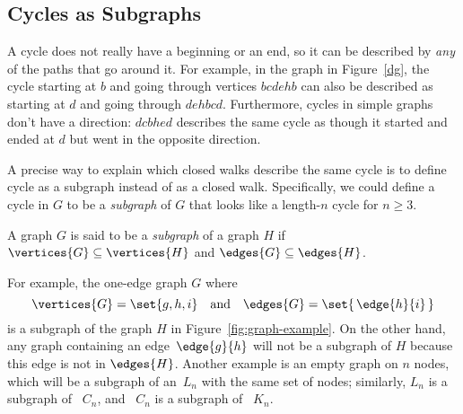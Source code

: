 \iffalse
The vertex sequence $bcdecb$ describes a closed walk in the graph
in Figure~\ref{dg}.  This sequence suggests indicates that the walk
begins and ends at vertex $b$, but

All the paths that describe the same closed walk have the same length
which is defined to be the \term{length of the walk}.  (Note that this
implies that going around the same walk twice is considered to be
different than going around it once.)

More precisely, a cycle is a
closed walk that can be described by a walk of length at least three whose
vertices are all different except for the beginning and end vertices.
So in contrast to \emph{paths}, the length of a \emph{cycle} is the
\emph{same} as the number of distinct vertices that appear in it.

\footnote{Technically speaking, we haven't ever defined what a cycle
\emph{is}, only how to describe it with paths.  But we won't need an
abstract definition of cycle, since all that matters about a cycle is which
paths describe it.}
\fi

\subsection{Cycles as Subgraphs}

A cycle does not really have a beginning or an end, so it can be
described by \emph{any} of the paths that go around it.  For example,
in the graph in Figure~\ref{dg}, the cycle starting at $b$ and going
through vertices $bcdehb$ can also be described as starting at $d$ and
going through $dehbcd$.  Furthermore, cycles in simple graphs don't
have a direction: $dcbhed$ describes the same cycle as though it
started and ended at $d$ but went in the opposite direction.

A precise way to explain which closed walks describe the same cycle is
to define cycle as a subgraph instead of as a closed walk.  Specifically, we
could define a cycle in $G$ to be a \emph{subgraph} of $G$ that looks
like a length-$n$ cycle for $n \ge 3$.

\begin{definition}\label{def:subgraph}
  A graph $G$ is said to be a \emph{subgraph} of a graph $H$ if
  $\vertices{G} \subseteq \vertices{H}$ and $\edges{G} \subseteq
  \edges{H}$.
\end{definition}

For example, the one-edge graph $G$ where
\begin{equation*}
   \vertices{G} = \set{ g, h, i } \quad \text{and}\quad  \edges{G} =
   \set{\, \edge{h}{i} \, }
\end{equation*}
is a subgraph of the graph $H$ in Figure~\ref{fig:graph-example}.  On the
other hand, any graph containing an edge~$\edge{g}{h}$ will not be a
subgraph of $H$ because this edge is not in $\edges{H}$.  Another example
is an empty graph on $n$ nodes, which will be a subgraph of an~$L_n$ with
the same set of nodes; similarly, $L_n$ is a subgraph of ~$C_n$, and ~$C_n$ is
a subgraph of ~$K_n$.

